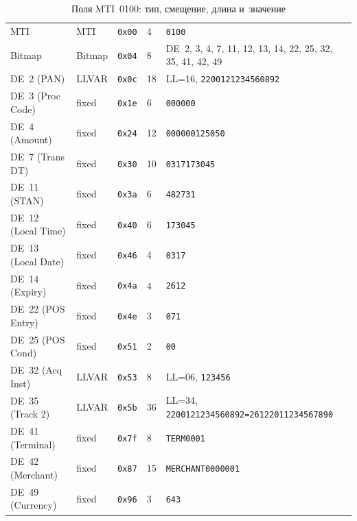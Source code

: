 \begin{table}[tbp]
  \caption{Поля MTI~0100: тип, смещение, длина и~значение}\label{tab:mti-0100-fields}
  \begingroup
  \tablesetup
  \begin{tabularx}{\textwidth}{@{}B{0.2\textwidth} P{0.09\textwidth} P{0.12\textwidth} P{0.09\textwidth} Y@{}}
    \toprule
    \headrow
     &  &  &  &  \\
    \midrule
    MTI & MTI & \texttt{0x00} & 4 & \texttt{0100} \\
    \rowsep
    Bitmap & Bitmap & \texttt{0x04} & 8 & DE~2, 3, 4, 7, 11, 12, 13, 14, 22, 25, 32, 35, 41, 42, 49 \\
    \rowsep
    DE~2 (PAN) & LLVAR & \texttt{0x0c} & 18 & LL=16, \texttt{2200121234560892} \\
    \rowsep
    DE~3 (Proc Code) & fixed & \texttt{0x1e} & 6 & \texttt{000000} \\
    \rowsep
    DE~4 (Amount) & fixed & \texttt{0x24} & 12 & \texttt{000000125050} \\
    \rowsep
    DE~7 (Trans DT) & fixed & \texttt{0x30} & 10 & \texttt{0317173045} \\
    \rowsep
    DE~11 (STAN) & fixed & \texttt{0x3a} & 6 & \texttt{482731} \\
    \rowsep
    DE~12 (Local Time) & fixed & \texttt{0x40} & 6 & \texttt{173045} \\
    \rowsep
    DE~13 (Local Date) & fixed & \texttt{0x46} & 4 & \texttt{0317} \\
    \rowsep
    DE~14 (Expiry) & fixed & \texttt{0x4a} & 4 & \texttt{2612} \\
    \rowsep
    DE~22 (POS Entry) & fixed & \texttt{0x4e} & 3 & \texttt{071} \\
    \rowsep
    DE~25 (POS Cond) & fixed & \texttt{0x51} & 2 & \texttt{00} \\
    \rowsep
    DE~32 (Acq Inst) & LLVAR & \texttt{0x53} & 8 & LL=06, \texttt{123456} \\
    \rowsep
    DE~35 (Track 2) & LLVAR & \texttt{0x5b} & 36 & LL=34, \texttt{2200121234560892=26122011234567890} \\
    \rowsep
    DE~41 (Terminal) & fixed & \texttt{0x7f} & 8 & \texttt{TERM0001} \\
    \rowsep
    DE~42 (Merchant) & fixed & \texttt{0x87} & 15 & \texttt{MERCHANT0000001} \\
    \rowsep
    DE~49 (Currency) & fixed & \texttt{0x96} & 3 & \texttt{643} \\
    \bottomrule
  \end{tabularx}\par
  \endgroup
\end{table}

